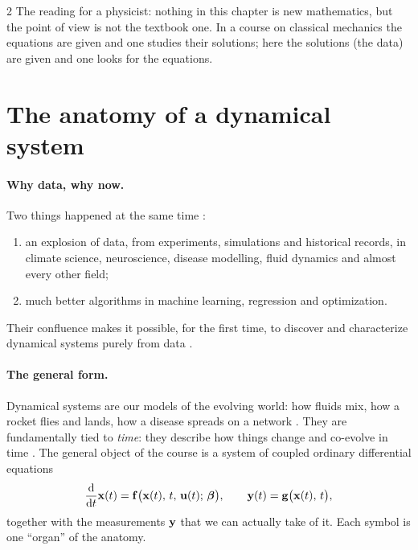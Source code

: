 \begin{paracol}{2}
The reading for a physicist: nothing in this chapter is new mathematics, but the point of view is
not the textbook one. In a course on classical mechanics the equations are given and one studies
their solutions; here the solutions (the data) are given and one looks for the equations.

\section{The anatomy of a dynamical system}\label{sec:ov-anatomy}

\paragraph{Why data, why now.} Two things happened at the same time :
\begin{enumerate}
  \item an explosion of data, from experiments, simulations and historical records, in climate
        science, neuroscience, disease modelling, fluid dynamics and almost every other field;
  \item much better algorithms in machine learning, regression and optimization.
\end{enumerate}
Their confluence makes it possible, for the first time, to discover and characterize dynamical
systems purely from data .

\paragraph{The general form.} Dynamical systems are our models of the evolving world: how fluids mix,
how a rocket flies and lands, how a disease spreads on a network . They are
fundamentally tied to \emph{time}: they describe how things change and co-evolve in time
. The general object of the course is a system of coupled ordinary differential
equations 
\begin{equation}\label{eq:ov-general}
  \frac{\mathrm d}{\mathrm dt}\mathbf{x}(t) = \mathbf{f}\big(\mathbf{x}(t),\,t,\,\mathbf{u}(t);\,\boldsymbol\beta\big),
  \qquad
  \mathbf{y}(t) = \mathbf{g}\big(\mathbf{x}(t),\,t\big),
\end{equation}
together with the measurements $\mathbf{y}$ that we can actually take of it. Each symbol is one ``organ''
of the anatomy.


\end{paracol}
